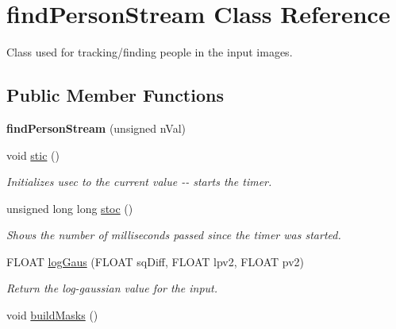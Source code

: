 \hypertarget{classfindPersonStream}{
\section{findPersonStream Class Reference}
\label{classfindPersonStream}
}


Class used for tracking/finding people in the input images.  


\subsection*{Public Member Functions}
\begin{DoxyCompactItemize}
\item 
\hypertarget{classfindPersonStream_a124341c8b0d81ff0682ab7585f1c15a4}{
{\bfseries findPersonStream} (unsigned nVal)}
\label{classfindPersonStream_a124341c8b0d81ff0682ab7585f1c15a4}

\item 
\hypertarget{classfindPersonStream_adad9d68d77b07e9fe42a0bafd02afa08}{
void \hyperlink{classfindPersonStream_adad9d68d77b07e9fe42a0bafd02afa08}{stic} ()}
\label{classfindPersonStream_adad9d68d77b07e9fe42a0bafd02afa08}

\begin{DoxyCompactList}\small\item\em Initializes {\ttfamily usec} to the current value -\/-\/ starts the timer. \item\end{DoxyCompactList}\item 
\hypertarget{classfindPersonStream_ae8e079ae9b7283ccefaea08319f56ec0}{
unsigned long long \hyperlink{classfindPersonStream_ae8e079ae9b7283ccefaea08319f56ec0}{stoc} ()}
\label{classfindPersonStream_ae8e079ae9b7283ccefaea08319f56ec0}

\begin{DoxyCompactList}\small\item\em Shows the number of milliseconds passed since the timer was started. \item\end{DoxyCompactList}\item 
\hypertarget{classfindPersonStream_a3ae972ba6df1daf5dc3313e00b4d19c4}{
FLOAT \hyperlink{classfindPersonStream_a3ae972ba6df1daf5dc3313e00b4d19c4}{logGaus} (FLOAT sqDiff, FLOAT lpv2, FLOAT pv2)}
\label{classfindPersonStream_a3ae972ba6df1daf5dc3313e00b4d19c4}

\begin{DoxyCompactList}\small\item\em Return the log-\/gaussian value for the input. \item\end{DoxyCompactList}\item 
\hypertarget{classfindPersonStream_a75c79495f6bea5917afce73830352a4c}{
void \hyperlink{classfindPersonStream_a75c79495f6bea5917afce73830352a4c}{buildMasks} ()}
\label{classfindPersonStream_a75c79495f6bea5917afce73830352a4c}


\end{DoxyCompactItemize}
